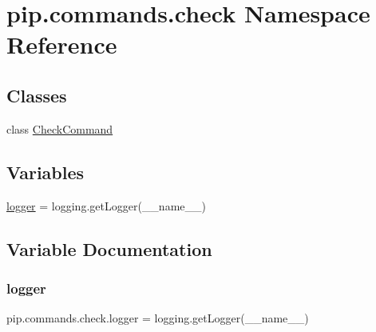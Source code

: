 \hypertarget{namespacepip_1_1commands_1_1check}{}\section{pip.\+commands.\+check Namespace Reference}
\label{namespacepip_1_1commands_1_1check}
\subsection*{Classes}
\begin{DoxyCompactItemize}
\item 
class \hyperlink{classpip_1_1commands_1_1check_1_1_check_command}{Check\+Command}
\end{DoxyCompactItemize}
\subsection*{Variables}
\begin{DoxyCompactItemize}
\item 
\hyperlink{namespacepip_1_1commands_1_1check_a3d82a9875100841dc5fca4c15ecda1ce}{logger} = logging.\+get\+Logger(\+\_\+\+\_\+name\+\_\+\+\_\+)
\end{DoxyCompactItemize}


\subsection{Variable Documentation}
\mbox{\label{namespacepip_1_1commands_1_1check_a3d82a9875100841dc5fca4c15ecda1ce}} 
\subsubsection{\texorpdfstring{logger}{logger}}
{\footnotesize\ttfamily pip.\+commands.\+check.\+logger = logging.\+get\+Logger(\+\_\+\+\_\+name\+\_\+\+\_\+)}

